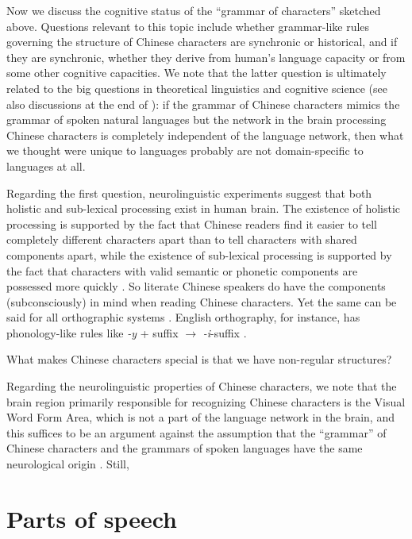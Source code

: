 \documentclass[UTF8, a4paper, oneside, scheme=plain, 12pt]{ctexrep}
\newcommand*{\textto}{$\to$}
\newcommand*{\citesec}[1]{\S~{#1}}
\newcommand*{\citepage}[1]{p.~{#1}}
\newcommand*{\citepages}[1]{pp.~{#1}}
\newcommand{\form}[1]{\emph{#1}}
\begin{document}
\small{
    Now we discuss the cognitive status of the ``grammar of characters'' sketched above.
    Questions relevant to this topic include whether grammar-like rules governing the structure of Chinese characters are synchronic or historical,
    and if they are synchronic, whether they derive from human's language capacity or from some other cognitive capacities.
    We note that the latter question is ultimately related to the big questions in theoretical linguistics and cognitive science (see also discussions at the end of ):
    if the grammar of Chinese characters mimics the grammar of spoken natural languages but the network in the brain processing Chinese characters is completely independent of the language network,
    then what we thought were unique to languages probably are not domain-specific to languages at all.
    
    Regarding the first question, neurolinguistic experiments suggest that both holistic and sub-lexical processing exist in human brain.
    The existence of holistic processing is supported by the fact that Chinese readers find it easier to tell completely different characters apart than to tell characters with shared components apart,
    while the existence of sub-lexical processing is supported by the fact that characters with valid semantic or phonetic components are possessed more quickly
    \citep[\citesec{2.2}]{duan2024chinese}.
    So literate Chinese speakers do have the components (subconsciously) in mind when reading Chinese characters.
    Yet the same can be said for all orthographic systems \citep[\citepages{23-25}]{myers2019grammar}.
    English orthography, for instance, has phonology-like rules like \form{-y} + suffix \textto{}  \form{-i}-suffix \citep[\citepage{26}]{myers2019grammar}.
    
    What makes Chinese characters special is that we have non-regular structures?
    
    Regarding the neurolinguistic properties of Chinese characters,
    we note that the brain region primarily responsible for recognizing Chinese characters
    is the Visual Word Form Area, which is not a part of the language network in the brain,
    and this suffices to be an argument against the assumption that the ``grammar'' of Chinese characters and the grammars of spoken languages have the same neurological origin \citep[\citepages{209-210}]{myers2019grammar}.
    Still, 
}



\chapter{Parts of speech}
\end{document}
